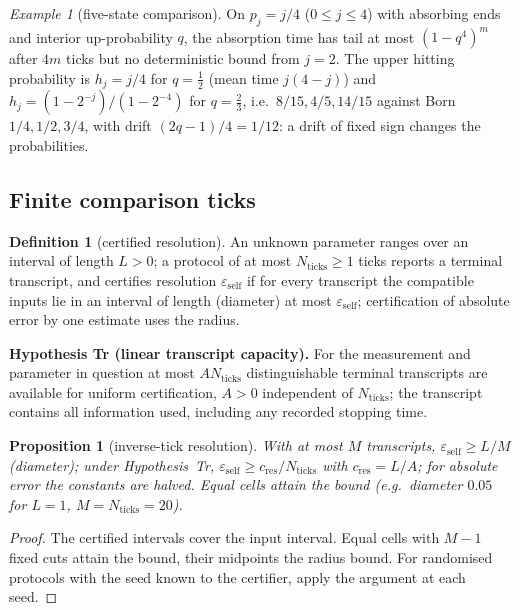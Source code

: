 \documentclass[aps,pra,onecolumn,superscriptaddress,nofootinbib,10pt]{revtex4-2}
\newtheorem{proposition}[theorem]{Proposition}
\theoremstyle{definition}
\newtheorem{definition}[theorem]{Definition}
\theoremstyle{remark}
\newtheorem{example}[theorem]{Example}
\begin{document}
\begin{example}[five-state comparison]\label{ex:sochain}
On $p_j=j/4$ ($0\le j\le4$) with absorbing ends and interior up-probability $q$, the absorption time has tail at most
$(1-q^4)^m$ after $4m$ ticks but no deterministic bound from $j=2$.  The upper hitting probability is $h_j=j/4$ for $q=\tfrac12$
(mean time $j(4-j)$) and $h_j=(1-2^{-j})/(1-2^{-4})$ for $q=\tfrac23$, i.e.\ $8/15,4/5,14/15$ against Born $1/4,1/2,3/4$, with drift
$(2q-1)/4=1/12$: a drift of fixed sign changes the probabilities.
\end{example}

\subsection{Finite comparison ticks}\label{sec:soticks}

\begin{definition}[certified resolution]\label{def:sotranscript}
An unknown parameter ranges over an interval of length $L>0$; a protocol of at most $N_{\mathrm{ticks}}\ge1$ ticks reports a
terminal transcript, and certifies resolution $\varepsilon_{\mathrm{self}}$ if for every transcript the compatible inputs lie in
an interval of length (diameter) at most $\varepsilon_{\mathrm{self}}$; certification of absolute error by one estimate uses
the radius.
\end{definition}

\smallskip\noindent\textbf{Hypothesis Tr (linear transcript capacity).}\label{hyp:Tr}  For the measurement and parameter in question
at most $AN_{\mathrm{ticks}}$ distinguishable terminal transcripts are available for uniform certification, $A>0$ independent
of $N_{\mathrm{ticks}}$; the transcript contains all information used, including any recorded stopping time.

\begin{proposition}[inverse-tick resolution]\label{prop:soresolution}
With at most $M$ transcripts, $\varepsilon_{\mathrm{self}}\ge L/M$ (diameter); under Hypothesis~Tr, $\varepsilon_{\mathrm{self}}\ge c_{\mathrm{res}}/N_{\mathrm{ticks}}$ with
$c_{\mathrm{res}}=L/A$; for absolute error the constants are halved.  Equal cells attain the bound (e.g.\ diameter $0.05$ for
$L=1$, $M=N_{\mathrm{ticks}}=20$).
\end{proposition}
\begin{proof}
The certified intervals cover the input interval.  Equal cells with $M-1$ fixed cuts attain the bound, their
midpoints the radius bound.  For randomised protocols with the seed known to the certifier, apply the
argument at each seed.
\end{proof}
\end{document}

